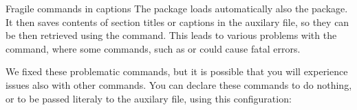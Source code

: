 \begin{issue}{Fragile commands in captions}
The  package loads automatically also the 
package. It then saves contents of section titles or captions in the auxilary file, 
so they can be then retrieved using the  command. This leads to various
problems with the  command, where some commands, such as  or
 could cause fatal errors. 

We fixed these problematic commands, but it is possible that you will experience
issues also with other commands. You can declare these commands to do nothing, or 
to be passed literaly to the auxilary file, using this configuration:

\begin{texsource}
\end{texsource}
\end{issue}


